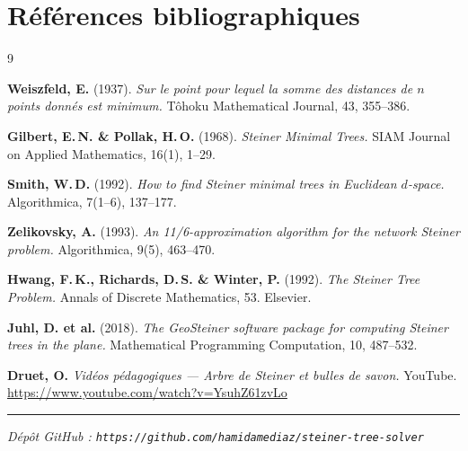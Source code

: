\documentclass[11pt, a4paper]{article}
\begin{document}
\section{Références bibliographiques}

\begin{thebibliography}{9}
\setlength{\itemsep}{2pt}

\textbf{Weiszfeld, E.} (1937).
\textit{Sur le point pour lequel la somme des distances de $n$ points donnés est minimum.}
Tôhoku Mathematical Journal, 43, 355--386.

\textbf{Gilbert, E.\,N. \& Pollak, H.\,O.} (1968).
\textit{Steiner Minimal Trees.}
SIAM Journal on Applied Mathematics, 16(1), 1--29.

\textbf{Smith, W.\,D.} (1992).
\textit{How to find Steiner minimal trees in Euclidean $d$-space.}
Algorithmica, 7(1--6), 137--177.

\textbf{Zelikovsky, A.} (1993).
\textit{An 11/6-approximation algorithm for the network Steiner problem.}
Algorithmica, 9(5), 463--470.

\textbf{Hwang, F.\,K., Richards, D.\,S. \& Winter, P.} (1992).
\textit{The Steiner Tree Problem.}
Annals of Discrete Mathematics, 53. Elsevier.

\textbf{Juhl, D. et al.} (2018).
\textit{The GeoSteiner software package for computing Steiner trees in the plane.}
Mathematical Programming Computation, 10, 487--532.

\textbf{Druet, O.}
\textit{Vidéos pédagogiques — Arbre de Steiner et bulles de savon.} YouTube.
\url{https://www.youtube.com/watch?v=YsuhZ61zvLo}

\end{thebibliography}

\vspace{0.6em}
\noindent\textcolor{bleu}{\rule{\textwidth}{0.7pt}}
\begin{center}
\scriptsize\textit{Dépôt GitHub : \texttt{https://github.com/hamidamediaz/steiner-tree-solver}}
\end{center}
\end{document}
